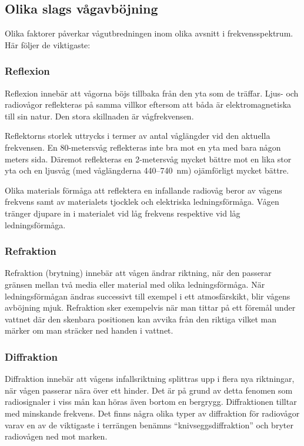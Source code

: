 \subsection{Olika slags vågavböjning}

Olika faktorer påverkar vågutbredningen inom olika avsnitt i
frekvensspektrum. Här följer de viktigaste:

\subsubsection{Reflexion}

Reflexion innebär att vågorna böjs tillbaka från den yta som de träffar.
Ljus- och radiovågor reflekteras på samma villkor eftersom
att båda är elektromagnetiska till sin natur.
Den stora skillnaden är vågfrekvensen.

Reflektorns storlek uttrycks i termer av antal våglängder vid den
aktuella frekvensen.
En 80-metersvåg reflekteras inte bra mot en yta med bara någon meters sida.
Däremot reflekteras en 2-metersvåg mycket bättre mot en lika stor yta och en
ljusvåg (med våglängderna 440--740~nm) ojämförligt mycket bättre.

Olika materials förmåga att reflektera en infallande radiovåg beror av
vågens frekvens samt av materialets tjocklek och elektriska ledningsförmåga.
Vågen tränger djupare in i materialet vid låg frekvens respektive vid låg
ledningsförmåga.

\subsubsection{Refraktion}

Refraktion (brytning) innebär att vågen ändrar riktning, när den
passerar gränsen mellan två media eller material med olika
ledningsförmåga.  När ledningsförmågan ändras successivt till exempel i ett
atmosfärskikt, blir vågens avböjning mjuk. Refraktion sker exempelvis
när man tittar på ett föremål under vattnet där den skenbara
positionen kan avvika från den riktiga vilket man märker om man
sträcker ned handen i vattnet.

\subsubsection{Diffraktion}

Diffraktion innebär att vågens infallsriktning splittras upp i flera
nya riktningar, när vågen passerar nära över ett hinder.
Det är på grund av detta fenomen som radiosignaler i viss mån kan höras även
bortom en bergrygg.
Diffraktionen tilltar med minskande frekvens. Det finns några olika
typer av diffraktion för radiovågor varav en av de viktigaste i
terrängen benämns ``knivseggsdiffraktion'' och bryter radiovågen ned
mot marken.
